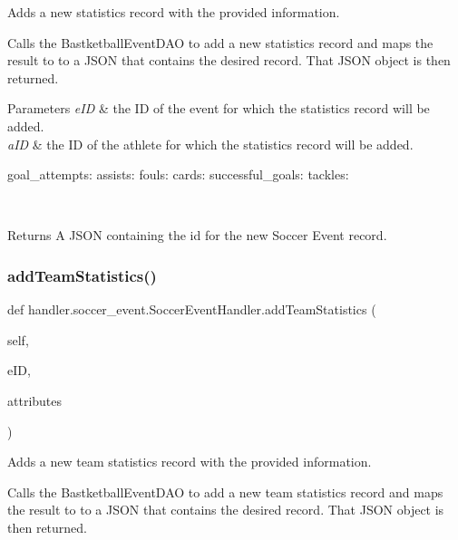 Adds a new statistics record with the provided information. 

Calls the Bastketball\+Event\+D\+AO to add a new statistics record and maps the result to to a J\+S\+ON that contains the desired record. That J\+S\+ON object is then returned.


\begin{DoxyParams}{Parameters}
{\em e\+ID} & the ID of the event for which the statistics record will be added. \\
\hline
{\em a\+ID} & the ID of the athlete for which the statistics record will be added. \begin{DoxyVerb}           goal_attempts:
           assists:
           fouls:
           cards:
           successful_goals:
           tackles:
\end{DoxyVerb}
\\
\hline
\end{DoxyParams}
\begin{DoxyReturn}{Returns}
A J\+S\+ON containing the id for the new Soccer Event record. 
\end{DoxyReturn}
\mbox{\label{classhandler_1_1soccer__event_1_1_soccer_event_handler_aeee6cd8f3e7f2d165e75e45623b94553}} 
\subsubsection{\texorpdfstring{add\+Team\+Statistics()}{addTeamStatistics()}}
{\footnotesize\ttfamily def handler.\+soccer\+\_\+event.\+Soccer\+Event\+Handler.\+add\+Team\+Statistics (\begin{DoxyParamCaption}\item[{}]{self,  }\item[{}]{e\+ID,  }\item[{}]{attributes }\end{DoxyParamCaption})}



Adds a new team statistics record with the provided information. 

Calls the Bastketball\+Event\+D\+AO to add a new team statistics record and maps the result to to a J\+S\+ON that contains the desired record. That J\+S\+ON object is then returned.


